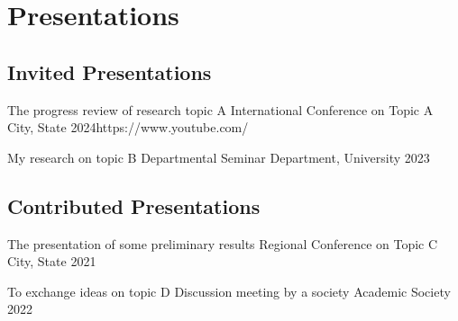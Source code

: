 \documentclass[a4paper,11pt]{article}
\begin{document}

\section{Presentations}

\subsection{Invited Presentations}
\begin{prelist}
	\keynote
		{The progress review of research topic A}
		{International Conference on Topic A}
		{City, State}
		{2024}{https://www.youtube.com/}{}

	\guest
		{My research on topic B}
		{Departmental Seminar}
		{Department, University}
		{2023}{}{}
\end{prelist}

\subsection{Contributed Presentations}
\begin{prelist}
	\oral
		{The presentation of some preliminary results}
		{Regional Conference on Topic C}
		{City, State}
		{2021}{}{}

	\poster
		{To exchange ideas on topic D}
		{Discussion meeting by a society}
		{Academic Society}
		{2022}{}{}

\end{prelist}
\end{document}

